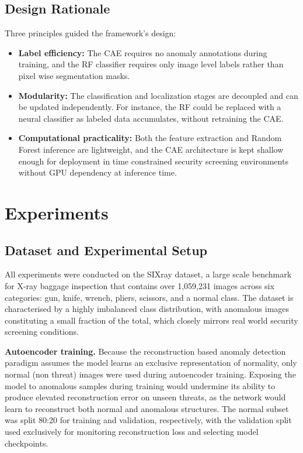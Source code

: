 \documentclass{bmvc2k}
\begin{document}
\subsection{Design Rationale}

Three principles guided the framework's design:

\begin{itemize}
    \item \textbf{Label efficiency:} The CAE requires no anomaly annotations \cite{akcay2018ganomaly, bergmann2019mvtec} during training, and the RF classifier requires only image level labels rather than pixel wise segmentation masks.
    
    \item \textbf{Modularity:} The classification and localization stages are decoupled \cite{hassan2021unsupervised} and can be updated independently. For instance, the RF could be replaced with a neural classifier as labeled data accumulates, without retraining the CAE.
    
    \item \textbf{Computational practicality:} Both the feature extraction and Random Forest inference are lightweight, and the CAE architecture is kept shallow enough for deployment in time constrained security screening environments without GPU dependency at inference time.
\end{itemize}

\section{Experiments}

\subsection{Dataset and Experimental Setup}

All experiments were conducted on the SIXray dataset, a large scale benchmark for X-ray baggage inspection that contains over 1,059,231 images across six categories: gun, knife, wrench, pliers, scissors, and a normal class. The dataset is characterised by a highly imbalanced class distribution, with anomalous images constituting a small fraction of the total, which closely mirrors real world security screening conditions.

\textbf{Autoencoder training.} Because the reconstruction based anomaly detection paradigm assumes the model learns an exclusive representation of normality, only normal (non threat) images were used during autoencoder training. Exposing the model to anomalous samples during training would undermine its ability to produce elevated reconstruction error on unseen threats, as the network would learn to reconstruct both normal and anomalous structures. The normal subset was split 80:20 for training and validation, respectively, with the validation split used exclusively for monitoring reconstruction loss and selecting model checkpoints.
\end{document}
